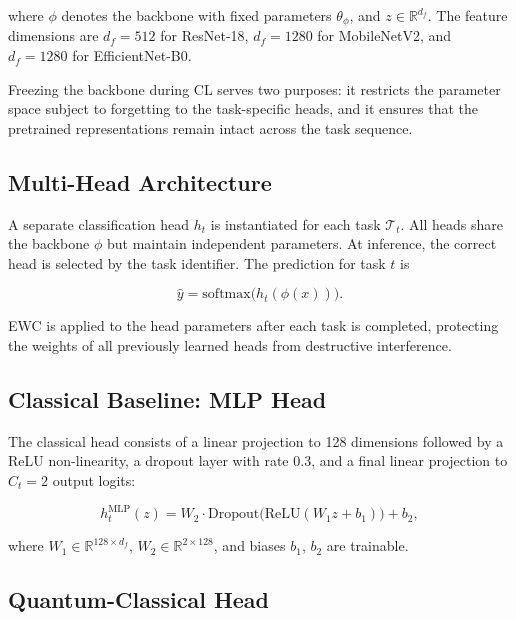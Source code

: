 \documentclass[acmlarge]{acmart}
\begin{document}
where $\phi$ denotes the backbone with fixed parameters $\theta_\phi$, and $z \in \mathbb{R}^{d_f}$.
The feature dimensions are $d_f = 512$ for ResNet-18, $d_f = 1280$ for MobileNetV2, and $d_f = 1280$ for EfficientNet-B0.

Freezing the backbone during CL serves two purposes: it restricts the parameter space subject to forgetting to the task-specific heads, and it ensures that the pretrained representations remain intact across the task sequence.

\subsection{Multi-Head Architecture}
\label{subsec:multihead}

A separate classification head $h_t$ is instantiated for each task $\mathcal{T}_t$.
All heads share the backbone $\phi$ but maintain independent parameters.
At inference, the correct head is selected by the task identifier.
The prediction for task $t$ is

\begin{equation}
\label{eq:prediction}
\hat{y} = \text{softmax}\bigl(h_t(\phi(x))\bigr).
\end{equation}

EWC is applied to the head parameters after each task is completed, protecting the weights of all previously learned heads from destructive interference.

\subsection{Classical Baseline: MLP Head}
\label{subsec:mlp}

The classical head consists of a linear projection to 128 dimensions followed by a ReLU non-linearity, a dropout layer with rate 0.3, and a final linear projection to $C_t = 2$ output logits:

\begin{equation}
\label{eq:mlp}
h_t^{\text{MLP}}(z) = W_2 \cdot \text{Dropout}\bigl(\text{ReLU}(W_1 z + b_1)\bigr) + b_2,
\end{equation}

where $W_1 \in \mathbb{R}^{128 \times d_f}$, $W_2 \in \mathbb{R}^{2 \times 128}$, and biases $b_1$, $b_2$ are trainable.

\subsection{Quantum-Classical Head}
\label{subsec:quantum_head}
\end{document}
